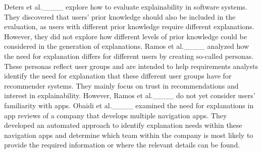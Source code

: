 Deters et al.____ explore how to evaluate explainability in software systems. 
They discovered that users' prior knowledge should also be included in the evaluation, as users with different prior knowledge require different explanations. However, they did not explore how different levels of prior knowledge could be considered in the generation of explanations.
Ramos et al.____ analyzed how the need for explanation differs for different users by creating so-called personas. These personas reflect user groups and are intended to help requirements analysts identify the need for explanation that these different user groups have for recommender systems. They mainly focus on trust in recommendations and interest in explainability. However, Ramos et al.____ do not yet consider users' familiarity with apps. 
Obaidi et al.____ examined the need for explanations in app reviews of a company that develops multiple navigation apps. They developed an automated approach to identify explanation needs within these navigation apps and determine which team within the company is most likely to provide the required information or where the relevant details can be found.